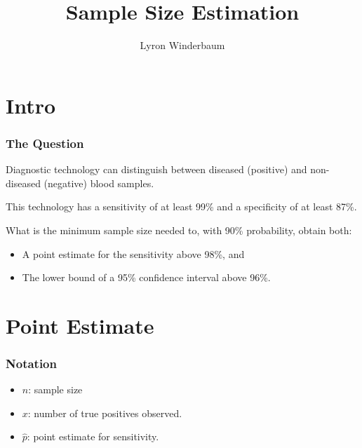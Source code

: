 \documentclass{beamer}\usepackage{knitr}
\title{Sample Size Estimation}
\author{Lyron Winderbaum}
\begin{document}
\section{Intro}

\maketitle

\begin{frame}
  \frametitle{The Question}
  
  Diagnostic technology can distinguish between diseased (positive) and non-diseased (negative) blood samples.
  
  This technology has a sensitivity of at least 99\% and a specificity of at least 87\%.
  
  What is the minimum sample size needed to, with 90\% probability, obtain both:
  \begin{itemize}
    \item A point estimate for the sensitivity above 98\%, and
    \item The lower bound of a 95\% confidence interval above 96\%.
  \end{itemize}
  
\end{frame}



\section{Point Estimate}

\begin{frame}
  \frametitle{Notation}
  
  \begin{itemize}
    \item $n$: sample size
    \item $x$: number of true positives observed.
    \item $\hat{p}$: point estimate for sensitivity.
  \end{itemize}
  
\end{frame}
\end{document}
